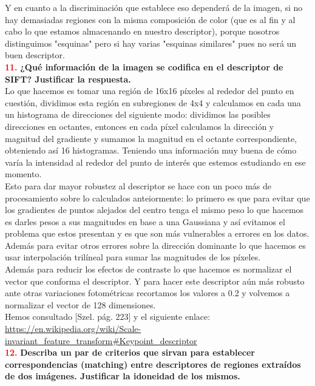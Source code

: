 \documentclass[10pt,a4paper]{article}
\begin{document}
Y en cuanto a la discriminación que establece eso dependerá de la imagen, si no hay demasiadas regiones con la misma composición de color (que es al fin y al cabo lo que estamos almacenando en nuestro descriptor), porque nosotros distinguimos "esquinas" pero si hay varias "esquinas similares" pues no será un buen descriptor.\\

\textcolor{red}{\textbf{11.}} \textbf{¿Qué información de la imagen se codifica en el descriptor de SIFT? Justificar la respuesta.}\\

Lo que hacemos es tomar una región de 16x16 píxeles al rededor del punto en cuestión, dividimos esta región en subregiones de 4x4 y calculamos en cada una un histograma de direcciones del siguiente modo: dividimos las posibles direcciones en octantes, entonces en cada píxel calculamos la dirección y magnitud del gradiente y sumamos la magnitud en el octante correspondiente, obteniendo así 16 histogramas. Teniendo una información muy buena de cómo varía la intensidad al rededor del punto de interés que estemos estudiando en ese momento.\\

Esto para dar mayor robustez al descriptor se hace con un poco más de procesamiento sobre lo calculados anteiormente: lo primero es que para evitar que los gradientes de puntos alejados del centro tenga el mismo peso lo que hacemos es darles pesos a sus magnitudes en base a una Gaussiana y así evitamos el problema que estos presentan y es que son más vulnerables a errores en los datos. Además para evitar otros errores sobre la dirección dominante lo que hacemos es usar interpolación trilíneal para sumar las magnitudes de los píxeles.\\

Además para reducir los efectos de contraste lo que hacemos es normalizar el vector que conforma el descriptor. Y para hacer este descriptor aún más robusto ante otras variaciones fotométricas recortamos los valores a 0.2 y volvemos a normalizar el vector de 128 dimensiones.\\

Hemos consultado [Szel. pág. 223] y el siguiente enlace: \url{https://en.wikipedia.org/wiki/Scale-invariant_feature_transform#Keypoint_descriptor}\\


\textcolor{red}{\textbf{12.}} \textbf{Describa un par de criterios que sirvan para establecer correspondencias (matching) entre descriptores de regiones extraídos de dos imágenes. Justificar la idoneidad de los mismos.}\\
\end{document}
